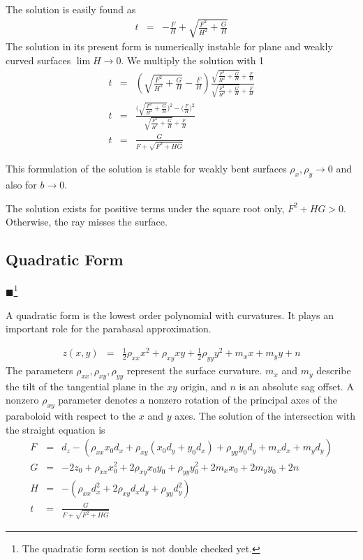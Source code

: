 \documentclass[12pt,a4paper,twoside,openright,BCOR10mm,headsepline,titlepage,abstracton,chapterprefix,final]{scrreprt}
\newcommand{\remark}[1]{{\color{red}$\blacksquare$}\footnote{{\color{red}#1}}}
\begin{document}
The solution is easily found as
\begin{eqnarray}
  t &=& - \frac{F}{H} + \sqrt{\frac{F^2}{H^2} + \frac{G}{H}}
\end{eqnarray}
The solution in its present form is numerically instable for plane and weakly curved surfaces $\lim H \rightarrow 0$.
We multiply the solution with 1
\begin{eqnarray}
  t &=&  \left( \sqrt{\frac{F^2}{H^2} + \frac{G}{H}} - \frac{F}{H} \right) \frac{\sqrt{\frac{F^2}{H^2} + \frac{G}{H}} + \frac{F}{H}}{\sqrt{\frac{F^2}{H^2} + \frac{G}{H}} + \frac{F}{H}} \\
  t &=&  \frac{ \bigg( \sqrt{\frac{F^2}{H^2} + \frac{G}{H}} \bigg)^2 - \bigg( \frac{F}{H} \bigg)^2 }{\sqrt{\frac{F^2}{H^2} + \frac{G}{H}} + \frac{F}{H}} \\
  t &=& \frac{G}{ F + \sqrt{F^2 + H G} }
\end{eqnarray}

This formulation of the solution is stable for weakly bent surfaces $\rho_x, \rho_y \rightarrow 0$ and also for $b \rightarrow 0$.

The solution exists for positive terms under the square root only, $F^2 + H G > 0$. 
Otherwise, the ray misses the surface.


\subsection{Quadratic Form}
\remark{The quadratic form section is not double checked yet.}

A quadratic form is the lowest order polynomial with curvatures.
It plays an important role for the parabasal approximation.

\begin{eqnarray}
 z(x,y) &=& \frac{1}{2} \rho_{xx} x^2 + \rho_{xy} x y + \frac{1}{2} \rho_{yy} y^2 + m_x x + m_y y + n
 \label{eq:quadratic_form_sag}
\end{eqnarray}
The parameters $\rho_{xx},\rho_{xy},\rho_{yy}$ represent the surface curvature. 
$m_x$ and $m_y$ describe the tilt of the tangential plane in the $xy$ origin, 
and $n$ is an absolute sag offset.
A nonzero $\rho_{xy}$ parameter denotes a nonzero rotation of the principal axes of the paraboloid with respect to the $x$ and $y$ axes.
The solution of the intersection with the straight equation is
\begin{eqnarray}
 F &=& d_z - \left( \rho_{xx} x_0 d_x + \rho_{xy} \left( x_0 d_y + y_0 d_x \right)  + \rho_{yy} y_0 d_y + m_x d_x + m_y d_y \right)   \\
 G &=& - 2 z_0 + \rho_{xx} x_0^2 + 2 \rho_{xy} x_0 y_0 + \rho_{yy} y_0^2 + 2 m_x x_0 + 2 m_y y_0 + 2 n\\
 H &=& - \left( \rho_{xx} d_x^2 +  2 \rho_{xy} d_x d_y + \rho_{yy} d_y^2 \right) \\
 t &=& \frac{G}{ F + \sqrt{F^2 + H G} }
 \label{eq:quadratic_form_t}
\end{eqnarray}
\end{document}
